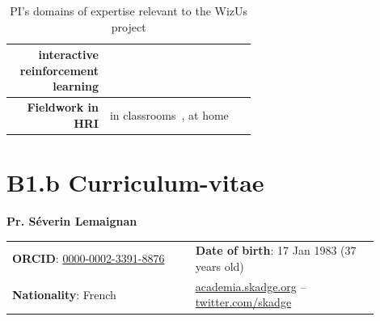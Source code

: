 \documentclass[11pt,a4paper]{report}
\newcommand{\project}{WizUs\xspace}
\newcommand{\eu}[1]{{\color{teal}\textbf{Guidelines EU ERC: #1}}}
\begin{document}
\begin{table}[h]
\begin{tabular}{rp{0.6\linewidth}}
        interactive reinforcement learning & \small \cite{senft2017leveraging,senft2017supervised, senft2019teaching} \\
        \midrule
        \textbf{Fieldwork in HRI} & \small in
        classrooms~\cite{hood2015when, lemaignan2016learning, jacq2016building,
        baxter2015wider,kennedy2016cautious,senft2018robots}, at home~\cite{mondada2015ranger}\\
        \bottomrule
    \end{tabular}
    \caption{\small PI's domains of expertise relevant to the \project project}
    \label{pi-expertise}
\end{table}



\newpage

\printbibliography





\newpage

\chapter{B1.b Curriculum-vitae}\label{the-principal-investigator}


{\LARGE \bf Pr. Séverin Lemaignan}

\vspace{2em}

\begin{tabular}{p{0.45\linewidth}p{0.45\linewidth}}
    \textbf{ORCID}:
    \href{http://orcid.org/0000-0002-3391-8876}{0000-0002-3391-8876} & \textbf{Date of birth}: 17 Jan 1983 (37 years old) \\
\textbf{Nationality}: French & \href{https://academia.skadge.org}{academia.skadge.org} -- \href{https://twitter.com/skadge}{twitter.com/skadge}
\end{tabular}
\end{document}
